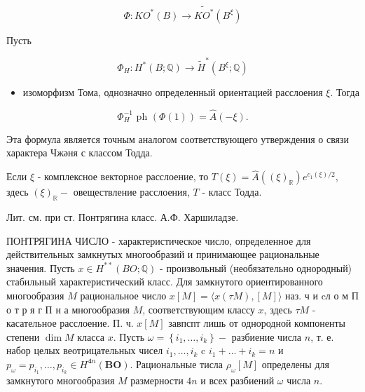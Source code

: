 \documentclass[10pt]{article}
\begin{document}
\[

\Phi: K O^{*}(B) \rightarrow \widetilde{K O^{*}}\left(B^{\xi}\right)

\]



Пусть



\[

\Phi_{H}: H^{*}(B ; \mathbb{Q}) \rightarrow \tilde{H}^{*}\left(B^{\xi} ; \mathbb{Q}\right)

\]



\begin{itemize}

  \item изоморфизм Тома, однозначно определенный ориентацией расслоения $\xi$. Тогда

\end{itemize}



\[

\Phi_{H}^{-1} \text { ph }(\Phi(1))=\hat{A}(-\xi) .

\]



Эта формула является точным аналогом соответствующего утверждения о связи характера Чжәня с классом Тодда.



Если $\xi$ - комплексное векторное расслоение, то $T(\xi)=\hat{A}\left((\xi)_{\mathbb{R}}\right) e^{c_{1}(\xi) / 2}$, здесь $(\xi)_{\mathbb{R}}-$ овеществление расслоения, $T$ - класс Тодда.



Лит. см. при ст. Понтрягина класс. А.Ф. Харшиладзе.



ПОНТРЯГИНА ЧИСЛО - характеристическое число, определенное для действительных замкнутых многообразий и принимающее рациональные значения. Пусть $x \in H^{* *}(B O ; \mathbb{Q})$ - произвольный (необязательно однородный) стабильный характеристический класс. Для замкнутого ориентированного многообразия $M$ рациональное число $x[M]=\langle x(\tau M),[M]\rangle$ наз. ч и cл о м П о т р я г П н а многообразия $M$, соответствующим классу $x$, здесь $\tau M$ - касательное расслоение. П. ч. $x[M]$ завпспт лишь от однородной компоненты степени $\operatorname{dim} M$ класса $x$. Пусть $\omega=\left\{i_{1}, \ldots, i_{k}\right\}-$ разбиение числа $n$, т. е. набор целых веотрицательных чисел $i_{1}, \ldots, i_{k}$ c $i_{1}+\ldots+i_{k}=n$ и $p_{\omega}=p_{i_{1}}, \ldots, p_{i_{k}} \in H^{\mathbf{4} n}(\boldsymbol{B O})$. Рациональные тисла $\rho_{\omega}[M]$ определены для замкнутого многообразия $M$ размерности $4 n$ и всех разбиений $\omega$ числа $n$.
\end{document}
